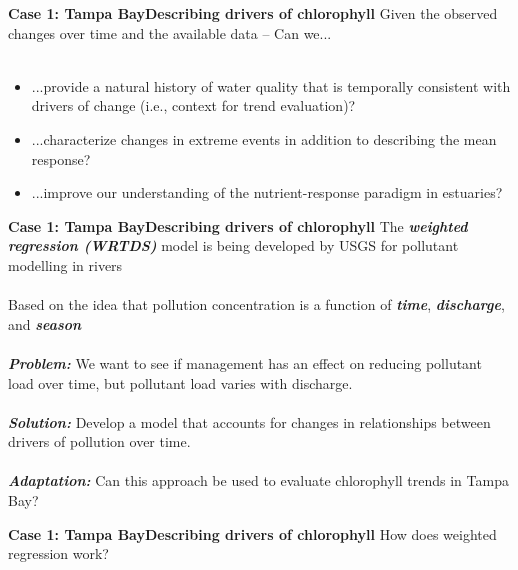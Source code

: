 \documentclass[serif]{beamer}\usepackage[]{graphicx}\usepackage[]{color}
\newcommand{\emtxt}[1]{\textbf{\textit{#1}}}
\begin{document}
\begin{frame}{\textbf{Case 1: Tampa Bay}}{\textbf{Describing drivers of chlorophyll}}
Given the observed changes over time and the available data -- Can we... \\~\\
\begin{itemize}
\item ...provide a natural history of water quality that is temporally consistent with drivers of change (i.e., context for trend evaluation)?
\item ...characterize changes in extreme events in addition to describing the mean response?  
\item ...improve our understanding of the nutrient-response paradigm in estuaries?
\end{itemize}
\end{frame}

\begin{frame}{\textbf{Case 1: Tampa Bay}}{\textbf{Describing drivers of chlorophyll}}
The \emtxt{weighted regression (WRTDS)} model is being developed by USGS for pollutant modelling in rivers \cite{Hirsch10}\\~\\
Based on the idea that pollution concentration is a function of \emtxt{time}, \emtxt{discharge}, and \emtxt{season}\\~\\
\emtxt{Problem:} We want to see if management has an effect on reducing pollutant load over time, but pollutant load varies with discharge.\\~\\
\emtxt{Solution:} Develop a model that accounts for changes in relationships between drivers of pollution over time.\\~\\
\emtxt{Adaptation:} Can this approach be used to evaluate chlorophyll trends in Tampa Bay?
\end{frame}



\begin{frame}{\textbf{Case 1: Tampa Bay}}{\textbf{Describing drivers of chlorophyll}}
How does weighted regression work?
\begin{center}
\end{center}
\end{frame}
\end{document}
